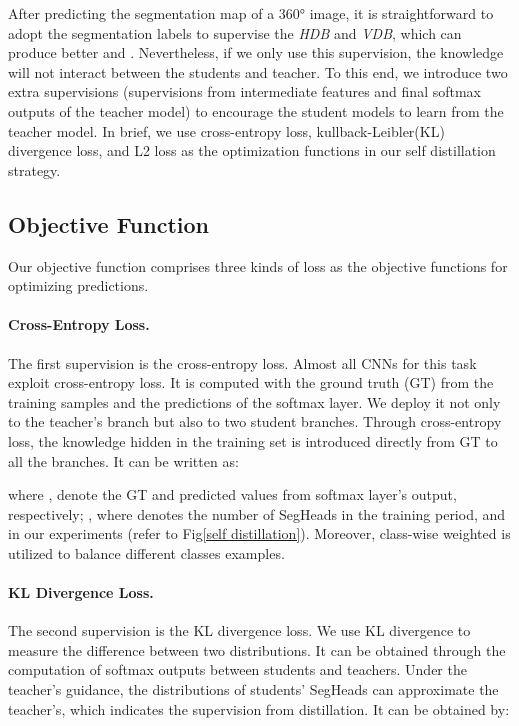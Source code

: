 \documentclass[runningheads]{llncs}
\begin{document}
	After predicting the segmentation map of a 360° image, it is straightforward to adopt the segmentation labels to supervise the \emph{HDB} and \emph{VDB}, which can produce better  and .
	Nevertheless, if we only use this supervision, the knowledge will not interact between the students and teacher.
	To this end, we introduce two extra supervisions (supervisions from intermediate features and final softmax outputs of the teacher model) to encourage the student models to learn from the teacher model. 
	In brief, we use cross-entropy loss, kullback-Leibler(KL) divergence loss, and L2 loss as the optimization functions in our self distillation strategy.
		
	
	\subsection{Objective Function}
	
	






	Our objective function comprises three kinds of loss as the objective functions for optimizing predictions. 
	
	\paragraph{Cross-Entropy Loss.} The first supervision is the cross-entropy loss.
	Almost all CNNs for this task exploit cross-entropy loss. 
	It is computed with the ground truth (GT) from the training samples and the predictions of the softmax layer. 
	We deploy it not only to the teacher's branch but also to two student branches.
	Through cross-entropy loss, the knowledge hidden in the training set is introduced directly from GT to all the branches.
	It can be written as:
	
	
	where  ,  denote the GT and predicted values from softmax layer’s output, respectively;
	, where  denotes the number of SegHeads in the training period, and  in our experiments (refer to Fig\ref{self distillation}).
	Moreover, class-wise weighted \cite{zhang2019orientation} is utilized to balance different classes examples.
	
	\paragraph{KL Divergence Loss.} The second supervision is the KL divergence loss.
	We use KL divergence to measure the difference between two distributions.
	It can be obtained through the computation of softmax outputs between students and teachers.
	Under the teacher’s guidance, the distributions of students' SegHeads can approximate the teacher's, which indicates the supervision from distillation.
	It can be obtained by:
	
\end{document}
